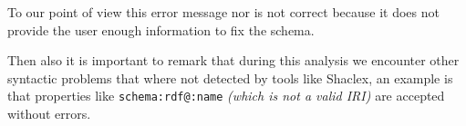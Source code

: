 To our point of view this error message nor is not correct because it does not provide the user enough information to fix the schema.

Then also it is important to remark that during this analysis we encounter other syntactic problems that where not detected by tools like Shaclex,
an example is that properties like \texttt{schema:rdf@:name} \textit{(which is not a valid IRI)} are accepted without errors.

\begin{table}
  \centering
  \caption{Detection of the different syntactic errors by the current existing ShEx tools that syntactically analyse the
  shape expressions.}
  \label{tb:sintactic-errors}
\end{table}
